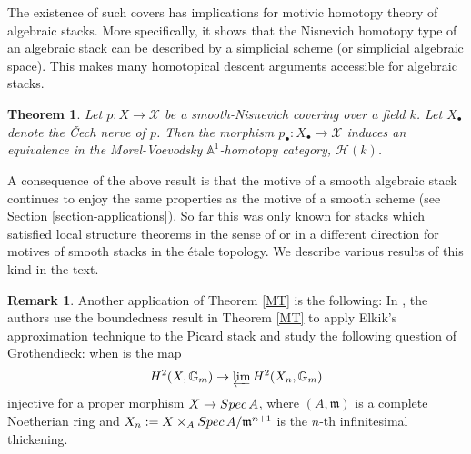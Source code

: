 \documentclass[10pt]{amsart}
\theoremstyle{plain}
\newtheorem{theorem}[thm]{Theorem}
\theoremstyle{definition}
\newtheorem{remark}[thm]{Remark}
\newcommand{\ilim}{\mathop{\varprojlim}\limits} %
\newcommand{\Spec}{{\rm Spec \,}}
\newcommand{\sH}{{\mathcal H}}
\newcommand{\sX}{{\mathcal X}}
\newcommand{\A}{{\mathbb A}}
\newcommand{\G}{{\mathbb G}}
\begin{document}

The existence of such covers has implications for motivic homotopy theory of algebraic stacks. More specifically, it shows that the Nisnevich homotopy type of an algebraic stack can be described by a simplicial scheme (or simplicial algebraic space). This makes many homotopical descent arguments accessible for algebraic stacks.


\begin{theorem}\label{corollary-smooth-nisnevich-presentation}
	Let $p:X\rightarrow \sX$ be a smooth-Nisnevich covering over a field $k$. Let $X_{\bullet}$ denote the \v{C}ech nerve of $p$. Then the morphism $p_{\bullet}:X_{\bullet}\rightarrow \sX$ induces an equivalence in the Morel-Voevodsky $\A^1$-homotopy category, $\sH(k)$.
\end{theorem}

A consequence of the above result is that the motive of a smooth algebraic stack continues to enjoy the same properties as the motive of a smooth scheme (see Section \ref{section-applications}). So far this was only known for stacks which satisfied local structure theorems in the sense of \cite{AHR19, ahhlr21} or in a different direction for motives of smooth stacks in the \'{e}tale topology. We describe various results of this kind in the text.

\begin{remark}\label{remark-mathur-kresch}
Another application of Theorem \ref{MT} is the following: In \cite{km22}, the authors use the boundedness result in Theorem \ref{MT} to apply Elkik's approximation technique to the Picard stack and study the following question of Grothendieck: when is the map
\[H^2(X,\G_m)\rightarrow \ilim H^2(X_n,\G_m)\]
injective for a proper morphism $X\rightarrow\Spec A$, where $(A,\mathfrak{m})$ is a complete Noetherian ring and $X_n:= X\times_A \Spec A/\mathfrak{m}^{n+1}$ is the $n$-th infinitesimal thickening.
\end{remark}
\end{document}

